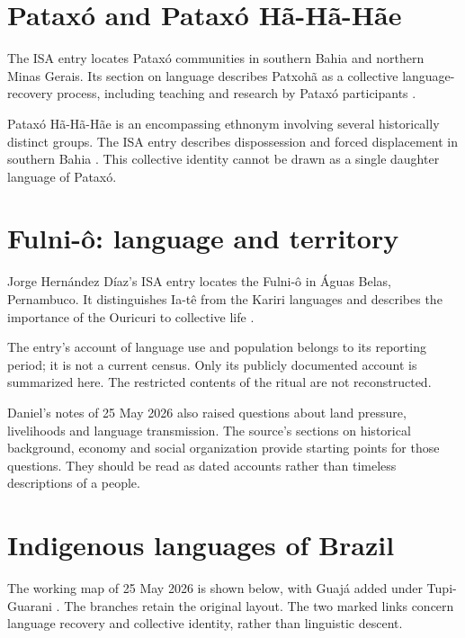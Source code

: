 \section{Pataxó and Pataxó Hã-Hã-Hãe}
\label{section-pataxo}

The ISA entry locates Pataxó communities
in southern Bahia and northern Minas
Gerais. Its section on language describes
Patxohã as a collective language-recovery
process, including teaching and research
by Pataxó participants
\cite{isa-pataxo}.

Pataxó Hã-Hã-Hãe is an encompassing
ethnonym involving several historically
distinct groups. The ISA entry describes
dispossession and forced displacement
in southern Bahia
\cite{isa-pataxo-hahahae}.
This collective identity cannot be drawn
as a single daughter language of Pataxó.

\section{Fulni-ô: language and territory}
\label{section-fulni-o}

Jorge Hernández Díaz's ISA entry locates
the Fulni-ô in Águas Belas, Pernambuco.
It distinguishes Ia-tê from the Kariri
languages and describes the importance
of the Ouricuri to collective life
\cite{isa-fulni-o}.

The entry's account of language use and
population belongs to its reporting
period; it is not a current census.
Only its publicly documented account is
summarized here. The restricted contents
of the ritual are not reconstructed.

Daniel's notes of 25 May 2026 also raised
questions about land pressure, livelihoods
and language transmission. The source's
sections on historical background, economy
and social organization provide starting
points for those questions. They should
be read as dated accounts rather than
timeless descriptions of a people.

\section{Indigenous languages of Brazil}
\label{section-indigenous-languages}

The working map of 25 May 2026 is shown
below, with Guajá added under Tupi-Guarani
\cite{isa-awa-guaja}.
The branches retain the original layout.
The two marked links concern language
recovery and collective identity, rather
than linguistic descent.

